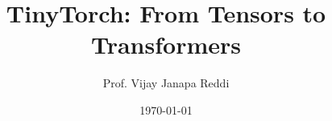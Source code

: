 \title{TinyTorch: From Tensors to Transformers}
\author{Prof. Vijay Janapa Reddi}
\date{\today}
\let\maketitle\relax
